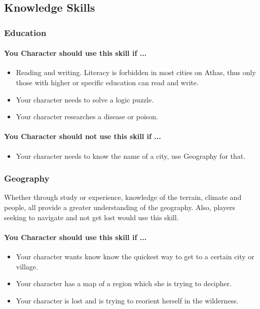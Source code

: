 \subsection{Knowledge Skills}
\begin{multicols}{2}
\subsubsection{Education}\label{skill:education}
\paragraph{You Character should use this skill if ...}
\begin{itemize}
    \item Reading and writing. Literacy is forbidden in most cities on Athas, thus
        only those with higher or specific education can read and write.
    \item Your character needs to solve a logic puzzle.
    \item Your character researches a disease or poison.
\end{itemize}
\paragraph{You Character should not use this skill if ...}
\begin{itemize}
    \item Your character needs to know the name of a city, use Geography for that.
\end{itemize}

\subsubsection{Geography}\label{skill:geography}
Whether through study or experience, knowledge of the terrain, climate and people,
all provide a greater understanding of the geography. Also, players seeking to
navigate and not get lost would use this skill.

\paragraph{You Character should use this skill if ...}
\begin{itemize}
    \item Your character wants know know the quickest way to get to a certain city or village.
    \item Your character has a map of a region which she is trying to decipher.
    \item Your character is lost and is trying to reorient herself in the wilderness.
\end{itemize}

\end{multicols}
